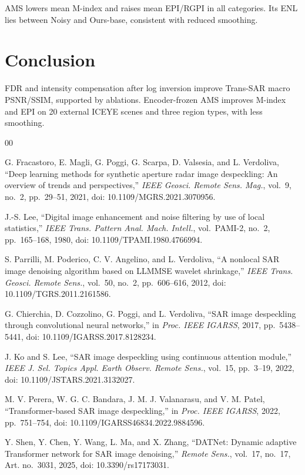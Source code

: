 \documentclass[journal]{IEEEtran}
\newcommand{\rev}[1]{{\color{RevisionBlue}#1}}
\newcommand{\condensed}[1]{{\color{CondensedGreen}#1}}
\newcommand{\rev}[1]{#1}
\newcommand{\condensed}[1]{#1}
\begin{document}
\rev{AMS lowers mean M-index and raises mean EPI/RGPI in all categories. Its ENL lies between Noisy and Ours-base, consistent with reduced smoothing.}

\section{Conclusion}
\condensed{FDR and intensity compensation after log inversion improve Trans-SAR macro PSNR/SSIM, supported by ablations. \rev{Encoder-frozen AMS improves M-index and EPI on 20 external ICEYE scenes and three region types, with less smoothing.}}

\begin{thebibliography}{00}

G. Fracastoro, E. Magli, G. Poggi, G. Scarpa, D. Valsesia, and L. Verdoliva, ``Deep learning methods for synthetic aperture radar image despeckling: An overview of trends and perspectives,'' \emph{IEEE Geosci. Remote Sens. Mag.}, vol.~9, no.~2, pp.~29--51, 2021, doi: 10.1109/MGRS.2021.3070956.

J.-S. Lee, ``Digital image enhancement and noise filtering by use of local statistics,'' \emph{IEEE Trans. Pattern Anal. Mach. Intell.}, vol.~PAMI-2, no.~2, pp.~165--168, 1980, doi: 10.1109/TPAMI.1980.4766994.

S. Parrilli, M. Poderico, C. V. Angelino, and L. Verdoliva, ``A nonlocal SAR image denoising algorithm based on LLMMSE wavelet shrinkage,'' \emph{IEEE Trans. Geosci. Remote Sens.}, vol.~50, no.~2, pp.~606--616, 2012, doi: 10.1109/TGRS.2011.2161586.

G. Chierchia, D. Cozzolino, G. Poggi, and L. Verdoliva, ``SAR image despeckling through convolutional neural networks,'' in \emph{Proc. IEEE IGARSS}, 2017, pp.~5438--5441, doi: 10.1109/IGARSS.2017.8128234.

J. Ko and S. Lee, ``SAR image despeckling using continuous attention module,'' \emph{IEEE J. Sel. Topics Appl. Earth Observ. Remote Sens.}, vol.~15, pp.~3--19, 2022, doi: 10.1109/JSTARS.2021.3132027.

M. V. Perera, W. G. C. Bandara, J. M. J. Valanarasu, and V. M. Patel, ``Transformer-based SAR image despeckling,'' in \emph{Proc. IEEE IGARSS}, 2022, pp.~751--754, doi: 10.1109/IGARSS46834.2022.9884596.

Y. Shen, Y. Chen, Y. Wang, L. Ma, and X. Zhang, ``DATNet: Dynamic adaptive Transformer network for SAR image denoising,'' \emph{Remote Sens.}, vol.~17, no.~17, Art. no.~3031, 2025, doi: 10.3390/rs17173031.


\end{thebibliography}
\end{document}
